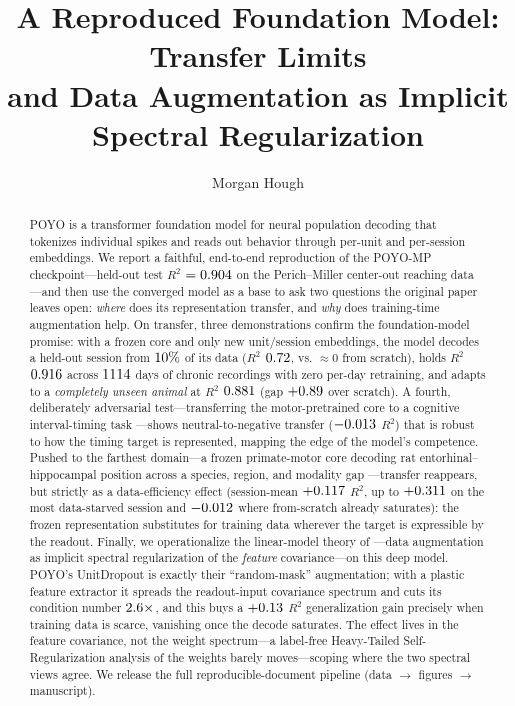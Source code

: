 \documentclass{article} %
\title{A Reproduced \poyo Foundation Model: Transfer Limits\\
and Data Augmentation as Implicit Spectral Regularization}
\author{Morgan Hough}
\newcommand{\poyo}{POYO\xspace}
\newcommand{\poymp}{POYO-MP\xspace}
\newcommand{\rtwo}{$R^2$\xspace}
\begin{document}
\maketitle

\begin{abstract}
\poyo \citep{azabou2023poyo} is a transformer foundation model for neural population
decoding that tokenizes individual spikes and reads out behavior through per-unit and
per-session embeddings. We report a faithful, end-to-end reproduction of the \poymp
checkpoint---held-out test \rtwo{} $=0.904$ on the Perich--Miller
center-out reaching data \citep{perich2018rapid}---and then use the converged model as a
base to ask two questions the original paper leaves open: \emph{where} does its
representation transfer, and \emph{why} does training-time augmentation help. On transfer,
three demonstrations confirm the foundation-model promise: with a frozen core and only new
unit/session embeddings, the model decodes a held-out session from $10\%$ of its
data (\rtwo{} $0.72$, vs. $\approx 0$ from scratch), holds \rtwo{} $0.916$ across
$1114$ days of chronic recordings with zero per-day retraining, and adapts to a
\emph{completely unseen animal} at \rtwo{} $0.881$ (gap $+0.89$ over scratch). A fourth,
deliberately adversarial test---transferring the motor-pretrained core to a cognitive
interval-timing task \citep{sohn2019bayesian}---shows neutral-to-negative transfer
($-0.013$ \rtwo{}) that is robust to how the timing target is represented, mapping the
edge of the model's competence. Pushed to the farthest domain---a frozen primate-motor core
decoding rat entorhinal--hippocampal position across a species, region, and modality gap
\citep{vollan2025}---transfer reappears, but strictly as a data-efficiency effect (session-mean
$+0.117$ \rtwo{}, up to $+0.311$ on the most data-starved session and
$-0.012$ where from-scratch already saturates): the frozen representation substitutes
for training data wherever the target is expressible by the readout. Finally, we operationalize
the linear-model theory of
\citet{lin2024augmentation}---data augmentation as implicit spectral regularization of the
\emph{feature} covariance---on this deep model. \poyo's UnitDropout is exactly their
``random-mask'' augmentation; with a plastic feature extractor it spreads the readout-input
covariance spectrum and cuts its condition number $2.6\times$, and this buys a
$+0.13$ \rtwo{} generalization gain precisely when training data is scarce, vanishing
once the decode saturates. The effect lives in the feature covariance, not the weight
spectrum---a label-free Heavy-Tailed Self-Regularization analysis of the weights barely
moves---scoping where the two spectral views agree. We release the full reproducible-document
pipeline (data $\to$ figures $\to$ manuscript).
\end{abstract}
\end{document}
